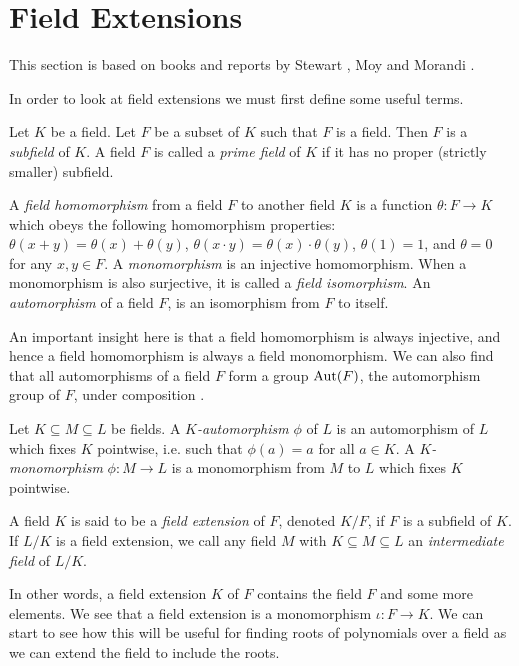 \section{Field Extensions} \label{sec:ext}
This section is based on books and reports by Stewart \cite[Chapters~4-5]{Stewart}, Moy \cite{Moy} and Morandi \cite[Chapter~1]{ morandi_field_1996}. 

In order to look at field extensions we must first define some useful terms. 
\begin{definition}
Let $K$ be a field. Let \(F\) be a subset of \(K\) such that $F$ is a field. Then $F$ is a \textit{subfield}
 of $K$.
A field \(F\) is called a \textit{prime field} of \(K\) if it has no proper (strictly smaller) subfield.
\end{definition}
\begin{definition}
	A \textit{field homomorphism} from a field $F$ to another field $K$ is a function $\theta: F \to K$ which obeys the following homomorphism properties: $\theta(x + y) = \theta(x) + \theta(y)$, $\theta(x\cdot y) = \theta(x) \cdot \theta(y)$, $\theta(1) = 1$, and $\theta = 0$ for any $x, y \in F$. 
    A \textit{monomorphism} is an injective homomorphism. 
	When a monomorphism is also surjective, it is called a \textit{field isomorphism}. An \textit{automorphism} of a field $F$, is an isomorphism from $F$ to itself.
\end{definition}

An important insight here is that a field homomorphism is always injective, and hence a field homomorphism is always a field monomorphism.
We can also find that all automorphisms of a field $F$ form a group $\operatorname{Aut}(F)$, the automorphism group of $F$, under composition \cite[p.~15]{morandi_field_1996}.

\begin{definition} \label{def:automorphism}
	Let $K \subseteq M \subseteq L$ be fields. A \textit{$K$-automorphism} $\phi$ of $L$ is an automorphism of $L$ which fixes $K$ pointwise, i.e. such that $\phi(a) = a$ for all $a \in K$. 
	A \textit{$K$-monomorphism} $\phi : M \to L$ is a monomorphism from $M$ to $L$ which fixes $K$ pointwise. 
\end{definition}

\begin{definition}
A field \(K\) is said to be a \textit{field extension} of \(F\), denoted \(K / F\), if \(F\) is a subfield of \(K\). If $L/K$ is a field extension, we call any field $M$ with $K \subseteq M \subseteq L$ an \textit{intermediate field} of $L/K$. 
\end{definition}
In other words, a field extension \(K\) of \(F\) contains the field \(F\) and some more elements.  We see that a field extension is a monomorphism \(\iota: F \to K\).  We can start to see how this will be useful for finding roots of polynomials over a field as we can extend the field to include the roots.

